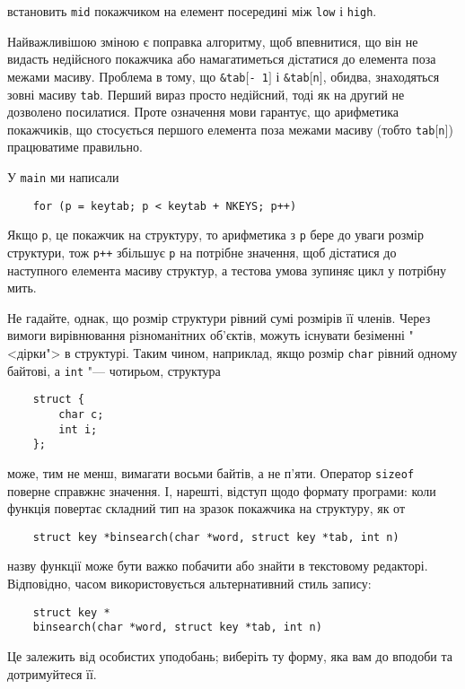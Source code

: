 \documentclass[a4paper,12pt]{book}
\begin{document}
  встановить \texttt{mid} покажчиком на елемент посередині між \texttt{low} і
  \texttt{high}.

  Найважливішою зміною є поправка алгоритму, щоб впевнитися, що він не видасть недійсного
  покажчика або намагатиметься дістатися до елемента поза межами масиву. Проблема в тому,
  що \texttt{\&tab\mbox{$[$}- 1\mbox{$]$}} і \texttt{\&tab\mbox{$[$}n\mbox{$]$}}, обидва, знаходяться зовні масиву
  \texttt{tab}. Перший вираз просто недійсний, тоді як на другий не дозволено посилатися.
  Проте означення мови гарантує, що арифметика покажчиків, що стосується першого елемента
  поза межами масиву (тобто \texttt{tab\mbox{$[$}n\mbox{$]$}}) працюватиме правильно.

  У \texttt{main} ми написали
  \begin{verbatim}
    for (p = keytab; p < keytab + NKEYS; p++)
  \end{verbatim}

  Якщо \texttt{p}, це покажчик на структуру, то арифметика з \texttt{p} бере до уваги
  розмір структури, тож \texttt{p++} збільшує \texttt{p} на потрібне значення, щоб
  дістатися до наступного елемента масиву структур, а тестова умова зупиняє цикл у
  потрібну мить.

  Не гадайте, однак, що розмір структури рівний сумі розмірів її членів. Через вимоги
  вирівнювання різноманітних об'єктів, можуть існувати безіменні "<дірки"> в
  структурі. Таким чином, наприклад, якщо розмір \texttt{char} рівний одному байтові, а
  \texttt{int} "--- чотирьом, структура
  \begin{verbatim}
    struct {
        char c;
        int i;
    };
  \end{verbatim}
  може, тим не менш, вимагати восьми байтів, а не п'яти. Оператор \texttt{sizeof} поверне
  справжнє значення. І, нарешті, відступ щодо формату програми: коли функція повертає
  складний тип на зразок покажчика на структуру, як от
  \begin{verbatim}
    struct key *binsearch(char *word, struct key *tab, int n)
  \end{verbatim}
  назву функції може бути важко побачити або знайти в текстовому редакторі. Відповідно,
  часом використовується альтернативний стиль запису:
  \begin{verbatim}
    struct key *
    binsearch(char *word, struct key *tab, int n)
  \end{verbatim}

  Це залежить від особистих уподобань; виберіть ту форму, яка вам до вподоби та
  дотримуйтеся її.
\end{document}
